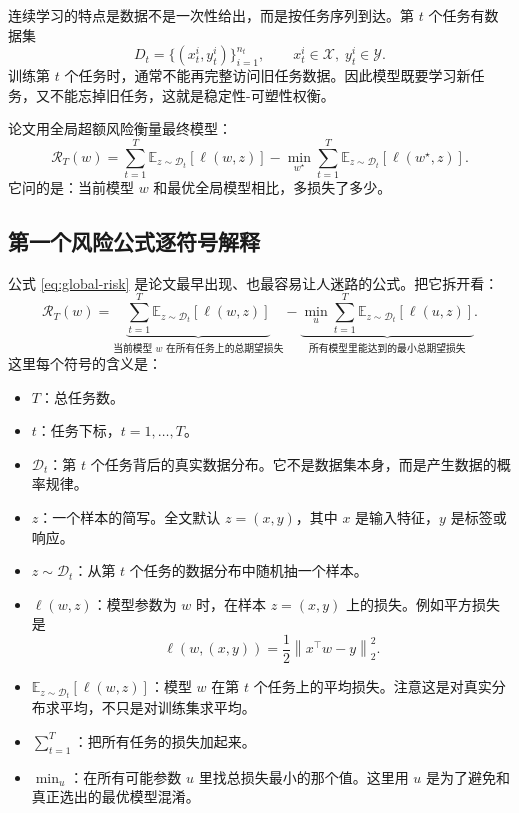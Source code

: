 \documentclass[UTF8,fontset=none,11pt]{ctexart}
\theoremstyle{cnstyle}
\newcommand{\E}{\mathbb{E}}
\newcommand{\calR}{\mathcal{R}}
\newcommand{\calD}{\mathcal{D}}
\newcommand{\norm}[1]{\left\lVert #1\right\rVert}
\begin{document}
连续学习的特点是数据不是一次性给出，而是按任务序列到达。第 \(t\) 个任务有数据集
\[
  D_t=\{(x_t^i,y_t^i)\}_{i=1}^{n_t},\qquad
  x_t^i\in\mathcal X,\; y_t^i\in\mathcal Y .
\]
训练第 \(t\) 个任务时，通常不能再完整访问旧任务数据。因此模型既要学习新任务，又不能忘掉旧任务，这就是稳定性-可塑性权衡。

论文用全局超额风险衡量最终模型：
\begin{equation}
  \calR_T(w)
  =
  \sum_{t=1}^T \E_{z\sim\calD_t}[\ell(w,z)]
  -
  \min_{w^\star}\sum_{t=1}^T\E_{z\sim\calD_t}[\ell(w^\star,z)] .
  \label{eq:global-risk}
\end{equation}
它问的是：当前模型 \(w\) 和最优全局模型相比，多损失了多少。

\subsection{第一个风险公式逐符号解释}

公式 \eqref{eq:global-risk} 是论文最早出现、也最容易让人迷路的公式。把它拆开看：
\[
  \calR_T(w)
  =
  \underbrace{\sum_{t=1}^T \E_{z\sim\calD_t}[\ell(w,z)]}_{\text{当前模型 }w\text{ 在所有任务上的总期望损失}}
  -
  \underbrace{\min_{u}\sum_{t=1}^T\E_{z\sim\calD_t}[\ell(u,z)]}_{\text{所有模型里能达到的最小总期望损失}} .
\]
这里每个符号的含义是：
\begin{itemize}
  \item \(T\)：总任务数。
  \item \(t\)：任务下标，\(t=1,\dots,T\)。
  \item \(\calD_t\)：第 \(t\) 个任务背后的真实数据分布。它不是数据集本身，而是产生数据的概率规律。
  \item \(z\)：一个样本的简写。全文默认 \(z=(x,y)\)，其中 \(x\) 是输入特征，\(y\) 是标签或响应。
  \item \(z\sim\calD_t\)：从第 \(t\) 个任务的数据分布中随机抽一个样本。
  \item \(\ell(w,z)\)：模型参数为 \(w\) 时，在样本 \(z=(x,y)\) 上的损失。例如平方损失是
  \[
    \ell(w,(x,y))=\frac12\norm{x^\top w-y}_2^2 .
  \]
  \item \(\E_{z\sim\calD_t}[\ell(w,z)]\)：模型 \(w\) 在第 \(t\) 个任务上的平均损失。注意这是对真实分布求平均，不只是对训练集求平均。
  \item \(\sum_{t=1}^T\)：把所有任务的损失加起来。
  \item \(\min_u\)：在所有可能参数 \(u\) 里找总损失最小的那个值。这里用 \(u\) 是为了避免和真正选出的最优模型混淆。
\end{itemize}
\end{document}

